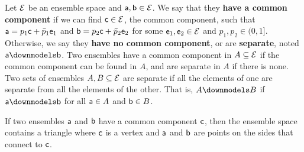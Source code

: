 \begin{mathSection}
\begin{defn}
	Let $\Ens$ be an ensemble space and $\ens[a], \ens[b] \in \Ens$. We say that they \textbf{have a common component} if we can find $\ens[c] \in \Ens$, the common component, such that $\ens[a] = p_1 \ens[c] + \bar{p}_1 \ens_1$ and $\ens[b] = p_2 \ens[c] + \bar{p}_2 \ens_2$ for some $\ens_1, \ens_2 \in \Ens$ and $p_1, p_2 \in (0,1]$. Otherwise, we say they \textbf{have no common component}, or are \textbf{separate}, noted $\ens[a] \separate \ens[b]$. Two ensembles have a common component in $A \subseteq \Ens$ if the common component can be found in $A$, and are separate in $A$ if there is none. Two sets of ensembles $A, B \subseteq \Ens$ are separate if all the elements of one are separate from all the elements of the other. That is, $A \separate B$ if $\ens[a] \separate \ens[b]$ for all $\ens[a] \in A$ and $\ens[b] \in B$.
\end{defn}

\begin{figure}[H]
	\centering
\end{figure}

\begin{remark}
	If two ensembles $\ens[a]$ and $\ens[b]$ have a common component $\ens[c]$, then the ensemble space contains a triangle where $\ens[c]$ is a vertex and $\ens[a]$ and $\ens[b]$ are points on the sides that connect to $\ens[c]$.
\end{remark}


\end{mathSection}
